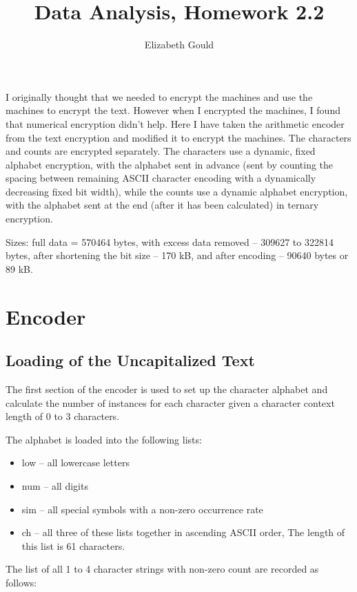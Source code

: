 \documentclass{article}
\title{Data Analysis, Homework 2.2}
\author{Elizabeth Gould}
\begin{document}
\maketitle

I originally thought that we needed to encrypt the machines and use the machines to encrypt the text. However when I encrypted the machines, I found that numerical encryption didn't help. Here I have taken the arithmetic encoder from the text encryption and modified it to encrypt the machines. The characters and counts are encrypted separately. The characters use a dynamic, fixed alphabet encryption, with the alphabet sent in advance (sent by counting the spacing between remaining ASCII character encoding with a dynamically decreasing fixed bit width), while the counts use a dynamic alphabet encryption, with the alphabet sent at the end (after it has been calculated) in ternary encryption.

Sizes: full data = 570464 bytes, with excess data removed -- 309627 to 322814 bytes, after shortening the bit size -- 170 kB, and after encoding -- 90640 bytes or 89 kB.

\section{Encoder}

\subsection{Loading of the Uncapitalized Text}

The first section of the encoder is used to set up the character alphabet and calculate the number of instances for each character given a character context length of 0 to 3 characters. 

\vspace{12pt}

\noindent The alphabet is loaded into the following lists:
\begin{itemize}
\item low -- all lowercase letters
\item num -- all digits
\item sim -- all special symbols with a non-zero occurrence rate
\item ch  -- all three of these lists together in ascending ASCII order, The length of this list is 61 characters.
\end{itemize}

\noindent The list of all 1 to 4 character strings with non-zero count are recorded as follows:
\end{document}
